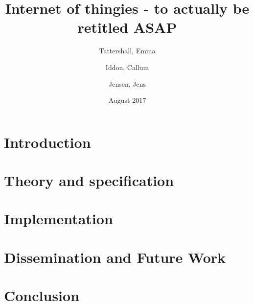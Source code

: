 \documentclass{article}
\title{Internet of thingies - to actually be retitled ASAP}
\author{
  Tattershall, Emma
  \and
  Iddon, Callum
  \and
  Jensen, Jens
}
\date{August 2017}
\begin{document}
\maketitle

\section{Introduction}


\section{Theory and specification}


\section{Implementation}


\section{Dissemination and Future Work}


\section{Conclusion}

\end{document}
